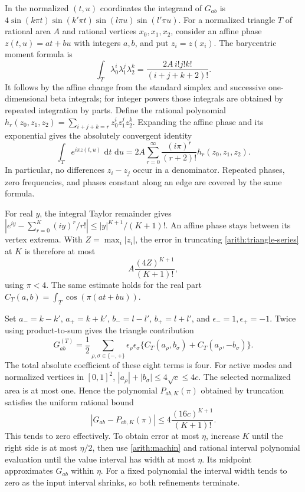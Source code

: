 \documentclass[11pt,reqno]{amsart}
\numberwithin{equation}{section}
\newcommand{\dd}{\,\mathrm d}
\begin{document}
In the normalized $(t,u)$ coordinates the integrand of
$G_{ab}$ is
$4\sin(k\pi t)\sin(k'\pi t)\sin(l\pi u)\sin(l'\pi u)$.
For a normalized triangle $T$ of rational area $A$ and rational
vertices $x_0,x_1,x_2$, consider an affine phase
$z(t,u)=a t+b u$ with integers $a,b$, and put $z_i=z(x_i)$.
The barycentric moment formula is
\[
 \int_T\lambda_0^i\lambda_1^j\lambda_2^k
 =\frac{2A\,i!j!k!}{(i+j+k+2)!}.
\]
It follows by the affine change from the standard simplex
and successive one-dimensional beta integrals; for integer
powers those integrals are obtained by repeated integration
by parts.  Define the rational polynomial
$h_r(z_0,z_1,z_2)=\sum_{i+j+k=r}z_0^iz_1^jz_2^k$.
Expanding the affine phase and its exponential gives the
absolutely convergent identity
\begin{equation}\label{arith:triangle-series}
 \int_T e^{i\pi z(t,u)}\,\dd t\,\dd u
 =2A\sum_{r=0}^{\infty}
           \frac{(i\pi)^r}{(r+2)!}h_r(z_0,z_1,z_2).
\end{equation}
In particular, no differences $z_i-z_j$ occur in a denominator.
Repeated phases, zero frequencies, and phases constant along
an edge are covered by the same formula.

For real $y$, the integral Taylor remainder gives
$|e^{iy}-\sum_{r=0}^{K}(iy)^r/r!|
\le|y|^{K+1}/(K+1)!$.
An affine phase stays between its vertex extrema.  With
$Z=\max_i|z_i|$, the error in truncating
\eqref{arith:triangle-series} at $K$ is therefore at most
\begin{equation}\label{arith:triangle-remainder}
 A\frac{(4Z)^{K+1}}{(K+1)!},
\end{equation}
using $\pi<4$.  The same estimate holds for the real part
$C_T(a,b)=\int_T\cos(\pi(at+bu))$.

Set $a_-=k-k'$, $a_+=k+k'$, $b_-=l-l'$,
$b_+=l+l'$, and $\epsilon_-=1,\epsilon_+=-1$.
Twice using product-to-sum gives the triangle contribution
\begin{equation}\label{arith:cosine-assembly}
 G_{ab}^{(T)}
 =\frac12\sum_{\rho,\sigma\in\{-,+\}}
     \epsilon_\rho\epsilon_\sigma
       \{C_T(a_\rho,b_\sigma)+C_T(a_\rho,-b_\sigma)\}.
\end{equation}
The total absolute coefficient of these eight terms is four.
For active modes and normalized vertices in $[0,1]^2$,
$|a_\rho|+|b_\sigma|\le4\sqrt c\le4c$.
The selected normalized area is at most one.
Hence the polynomial $P_{ab,K}(\pi)$ obtained by truncation
satisfies the uniform rational bound
\begin{equation}\label{arith:gram-remainder}
 |G_{ab}-P_{ab,K}(\pi)|
 \le4\frac{(16c)^{K+1}}{(K+1)!}.
\end{equation}
This tends to zero effectively.  To obtain error at most
$\eta$, increase $K$ until the right side is at most $\eta/2$,
then use \eqref{arith:machin} and rational interval polynomial
evaluation until the value interval has width at most $\eta$.
Its midpoint approximates $G_{ab}$ within $\eta$.
For a fixed polynomial the interval width tends to zero
as the input interval shrinks, so both refinements terminate.
\end{document}
